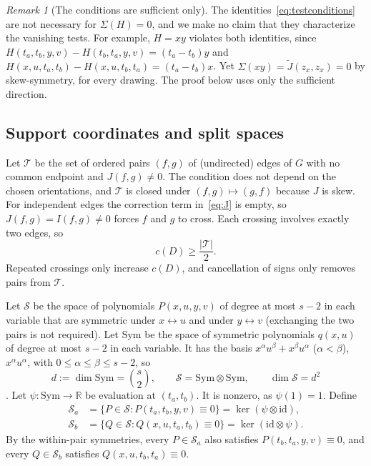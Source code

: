 \documentclass[11pt,a4paper]{article}
\theoremstyle{definition}
\theoremstyle{remark}
\newtheorem{remark}[theorem]{Remark}
\numberwithin{equation}{section}
\newcommand{\R}{\mathbb R}
\newcommand{\SSS}{\mathcal S}
\newcommand{\TT}{\mathcal T}
\newcommand{\Sym}{\mathrm{Sym}}
\begin{document}
\begin{remark}[The conditions are sufficient only]\label{rem:nonconverse}
The identities~\eqref{eq:testconditions} are not necessary for $\Sigma(H)=0$, and we make no claim that they characterize the vanishing tests. For example, $H=xy$ violates both identities, since $H(t_a,t_b,y,v)-H(t_b,t_a,y,v)=(t_a-t_b)y$ and $H(x,u,t_a,t_b)-H(x,u,t_b,t_a)=(t_a-t_b)x$. Yet $\Sigma(xy)=\widetilde J(z_x,z_x)=0$ by skew-symmetry, for every drawing. The proof below uses only the sufficient direction.
\end{remark}

\subsection{Support coordinates and split spaces}
Let $\TT$ be the set of ordered pairs $(f,g)$ of (undirected) edges of $G$ with no common endpoint and $J(f,g)\ne0$. The condition does not depend on the chosen orientations, and $\TT$ is closed under $(f,g)\mapsto(g,f)$ because $J$ is skew. For independent edges the correction term in~\eqref{eq:J} is empty, so $J(f,g)=I(f,g)\ne0$ forces $f$ and $g$ to cross. Each crossing involves exactly two edges, so
\begin{equation}\label{eq:support}
c(D)\ge\frac{|\TT|}{2}.
\end{equation}
Repeated crossings only increase $c(D)$, and cancellation of signs only removes pairs from $\TT$.

Let $\SSS$ be the space of polynomials $P(x,u,y,v)$ of degree at most $s-2$ in each variable that are symmetric under $x\leftrightarrow u$ and under $y\leftrightarrow v$ (exchanging the two pairs is not required). Let $\Sym$ be the space of symmetric polynomials $q(x,u)$ of degree at most $s-2$ in each variable. It has the basis $x^\alpha u^\beta+x^\beta u^\alpha$ ($\alpha<\beta$), $x^\alpha u^\alpha$, with $0\le\alpha\le\beta\le s-2$, so
\[
d:=\dim\Sym=\binom s2,\qquad \SSS=\Sym\otimes\Sym,\qquad \dim\SSS=d^2
\]
\cite[equation \texttt{eq:dim}]{OAIKn}. Let $\psi:\Sym\to\R$ be evaluation at $(t_a,t_b)$. It is nonzero, as $\psi(1)=1$. Define
\begin{align*}
\SSS_a&=\{P\in\SSS:P(t_a,t_b,y,v)\equiv0\}=\ker(\psi\otimes\mathrm{id}),\\
\SSS_b&=\{Q\in\SSS:Q(x,u,t_a,t_b)\equiv0\}=\ker(\mathrm{id}\otimes\psi).
\end{align*}
By the within-pair symmetries, every $P\in\SSS_a$ also satisfies $P(t_b,t_a,y,v)\equiv0$, and every $Q\in\SSS_b$ satisfies $Q(x,u,t_b,t_a)\equiv0$.
\end{document}
